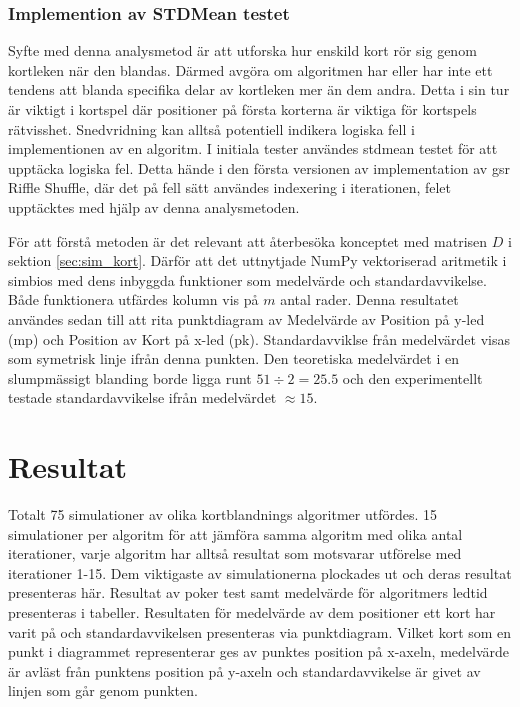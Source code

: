\documentclass[swedish,a4paper]{article}
\begin{document}
\subsubsection{Implemention av STDMean testet}
Syfte med denna analysmetod är att utforska hur enskild kort rör sig genom
kortleken när den blandas. Därmed avgöra om algoritmen har eller har inte ett
tendens att blanda specifika delar av kortleken mer än dem andra. Detta i sin
tur är viktigt i kortspel där positioner på första korterna är viktiga för
kortspels rätvisshet. Snedvridning kan alltså potentiell indikera logiska fell i
implementionen av en algoritm. I initiala tester användes \gls{stdmean} testet
för att upptäcka logiska fel. Detta hände i den första versionen av
implementation av \gls{gsr} Riffle Shuffle, där det på fell sätt användes indexering
i iterationen, felet upptäcktes med hjälp av denna analysmetoden. 

För att förstå metoden är det relevant att återbesöka konceptet med matrisen $D$ i sektion 
\ref{sec:sim_kort}. Därför att det uttnytjade NumPy vektoriserad aritmetik i
simbios med dens inbyggda funktioner som medelvärde och standardavvikelse. Både
funktionera utfärdes kolumn vis på $m$ antal rader. Denna resultatet användes sedan till
att rita punktdiagram av Medelvärde av Position på y-led (\gls{mp}) och
Position av Kort på x-led (\gls{pk}). Standardavviklse från medelvärdet visas
som symetrisk linje ifrån denna punkten. Den teoretiska medelvärdet i 
en slumpmässigt blanding borde ligga runt $51 \div 2 = 25.5$ och den
experimentellt testade standardavvikelse ifrån medelvärdet $\approx 15$.

\section{Resultat}


Totalt 75 simulationer av olika kortblandnings algoritmer utfördes. 15
simulationer per algoritm för att jämföra samma algoritm med olika antal
iterationer, varje algoritm har alltså resultat som motsvarar utförelse
med iterationer 1-15. Dem viktigaste av simulationerna plockades ut och
deras resultat presenteras här. Resultat av poker test samt medelvärde
för algoritmers ledtid presenteras i tabeller. Resultaten för medelvärde
av dem positioner ett kort har varit på och standardavvikelsen
presenteras via punktdiagram. Vilket kort som en punkt i diagrammet
representerar ges av punktes position på x-axeln, medelvärde är avläst
från punktens position på y-axeln och standardavvikelse är givet av
linjen som går genom punkten. 
\end{document}
